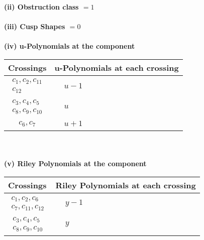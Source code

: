 \documentclass[1p]{elsarticle_modified}
\theoremstyle{definition}
\begin{document}
\flushleft \textbf{(ii) Obstruction class $= 1$}\\~\\
\flushleft \textbf{(iii) Cusp Shapes $= 0$}\\~\\
\newpage\renewcommand{\arraystretch}{1}
\flushleft \textbf{(iv) u-Polynomials at the component}\newline \\
\begin{tabular}{m{50pt}|m{274pt}}
Crossings & \hspace{64pt}u-Polynomials at each crossing \\
\hline $$\begin{aligned}c_{1},c_{2},c_{11}\\c_{12}\end{aligned}$$&$\begin{aligned}
&u-1
\end{aligned}$\\
\hline $$\begin{aligned}c_{3},c_{4},c_{5}\\c_{8},c_{9},c_{10}\end{aligned}$$&$\begin{aligned}
&u
\end{aligned}$\\
\hline $$\begin{aligned}c_{6},c_{7}\end{aligned}$$&$\begin{aligned}
&u+1
\end{aligned}$\\
\hline
\end{tabular}\\~\\
\newpage\renewcommand{\arraystretch}{1}
\flushleft \textbf{(v) Riley Polynomials at the component}\newline \\
\begin{tabular}{m{50pt}|m{274pt}}
Crossings & \hspace{64pt}Riley Polynomials at each crossing \\
\hline $$\begin{aligned}c_{1},c_{2},c_{6}\\c_{7},c_{11},c_{12}\end{aligned}$$&$\begin{aligned}
&y-1
\end{aligned}$\\
\hline $$\begin{aligned}c_{3},c_{4},c_{5}\\c_{8},c_{9},c_{10}\end{aligned}$$&$\begin{aligned}
&y
\end{aligned}$\\
\hline
\end{tabular}\\~\\
\end{document}
